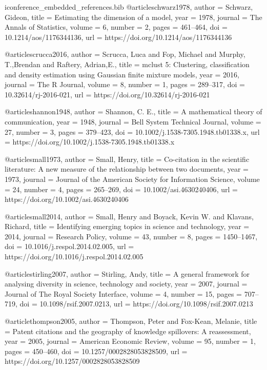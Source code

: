 \begin{filecontents*}[overwrite]{iconference_embedded_references.bib}
@article{schwarz1978,
  author = {Schwarz, Gideon},
  title = {Estimating the dimension of a model},
  year = {1978},
  journal = {The Annals of Statistics},
  volume = {6},
  number = {2},
  pages = {461--464},
  doi = {10.1214/aos/1176344136},
  url = {https://doi.org/10.1214/aos/1176344136}
}

@article{scrucca2016,
  author = {Scrucca, Luca and Fop, Michael and Murphy, T.,Brendan and Raftery, Adrian,E.},
  title = {{mclust} 5: Clustering, classification and density estimation using {Gaussian} finite mixture models},
  year = {2016},
  journal = {The R Journal},
  volume = {8},
  number = {1},
  pages = {289--317},
  doi = {10.32614/rj-2016-021},
  url = {https://doi.org/10.32614/rj-2016-021}
}

@article{shannon1948,
  author = {Shannon, C. E.},
  title = {A mathematical theory of communication},
  year = {1948},
  journal = {Bell System Technical Journal},
  volume = {27},
  number = {3},
  pages = {379--423},
  doi = {10.1002/j.1538-7305.1948.tb01338.x},
  url = {https://doi.org/10.1002/j.1538-7305.1948.tb01338.x}
}

@article{small1973,
  author = {Small, Henry},
  title = {Co-citation in the scientific literature: A new measure of the relationship between two documents},
  year = {1973},
  journal = {Journal of the American Society for Information Science},
  volume = {24},
  number = {4},
  pages = {265--269},
  doi = {10.1002/asi.4630240406},
  url = {https://doi.org/10.1002/asi.4630240406}
}

@article{small2014,
  author = {Small, Henry and Boyack, Kevin W. and Klavans, Richard},
  title = {Identifying emerging topics in science and technology},
  year = {2014},
  journal = {Research Policy},
  volume = {43},
  number = {8},
  pages = {1450--1467},
  doi = {10.1016/j.respol.2014.02.005},
  url = {https://doi.org/10.1016/j.respol.2014.02.005}
}

@article{stirling2007,
  author = {Stirling, Andy},
  title = {A general framework for analysing diversity in science, technology and society},
  year = {2007},
  journal = {Journal of The Royal Society Interface},
  volume = {4},
  number = {15},
  pages = {707--719},
  doi = {10.1098/rsif.2007.0213},
  url = {https://doi.org/10.1098/rsif.2007.0213}
}

@article{thompson2005,
  author = {Thompson, Peter and Fox-Kean, Melanie},
  title = {Patent citations and the geography of knowledge spillovers: A reassessment},
  year = {2005},
  journal = {American Economic Review},
  volume = {95},
  number = {1},
  pages = {450--460},
  doi = {10.1257/0002828053828509},
  url = {https://doi.org/10.1257/0002828053828509}
}


\end{filecontents*}
